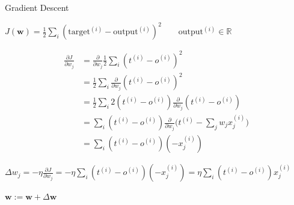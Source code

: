 \begin{frame}{Gradient Descent}
	\begin{center}
	    $J(\mathbf{w})  = \frac{1}{2} \sum_{i} (\text{target}^{(i)} - \text{output}^{(i)})^2 \quad \quad \text{output}^{(i)} \in \mathbb{R}$
	    
	    \vspace{5}
	    
	    \begin{equation*} 
            \begin{split}
                \frac{\partial J}{\partial w_j} & = \frac{\partial }{\partial w_j} \frac{1}{2} \sum_i  (t^{(i)} - o^{(i)})^2 \\
                 & = \frac{1}{2} \sum_i \frac{\partial}{\partial w_j} (t^{(i)} - o^{(i)})^2 \\
                 & = \frac{1}{2} \sum_i 2 (t^{(i)} - o^{(i)}) \frac{\partial}{\partial w_j} (t^{(i)} - o^{(i)}) \\ 
                 & = \sum_i (t^{(i)} - o^{(i)}) \frac{\partial}{\partial w_j} \bigg(t^{(i)} - \sum_j w_j x^{(i)}_{j}\bigg) \\
                 & = \sum_i  (t^{(i)} - o^{(i)})(-x^{(i)}_{j}) 
             \end{split}
        \end{equation*}
        
        
        \vspace{5}
        
        $\Delta w_j = - \eta \frac{\partial J}{\partial w_j} = - \eta \sum_i  (t^{(i)} - o^{(i)})(- x^{(i)}_{j}) = \eta \sum_i (t^{(i)} - o^{(i)})x^{(i)}_{j}$
        
        
        $\mathbf{w} := \mathbf{w} + \Delta \mathbf{w}$

	\end{center}
	
\end{frame}
